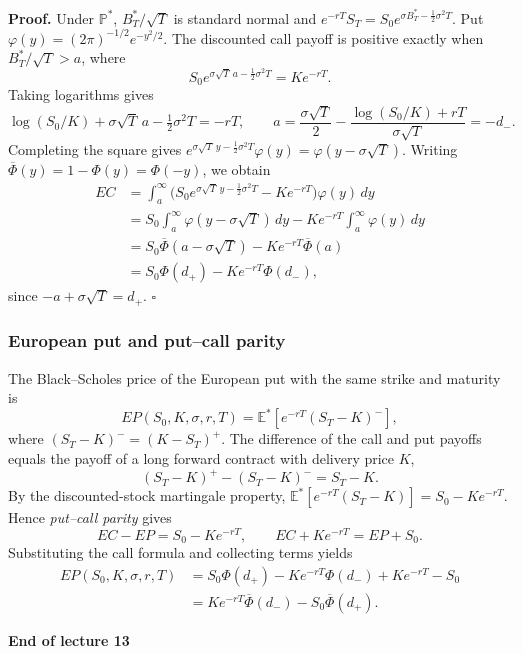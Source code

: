 \documentclass[11pt,a4paper]{article}
\begin{document}
\noindent\textbf{Proof.}
Under $\mathbb P^*$, $B_T^*/\sqrt T$ is standard normal and
$e^{-rT}S_T=S_0e^{\sigma B_T^*-\frac12\sigma^2T}$. Put
$\varphi(y)=(2\pi)^{-1/2}e^{-y^2/2}$. The discounted call payoff is
positive exactly when $B_T^*/\sqrt T>a$, where
\[
S_0e^{\sigma\sqrt T\,a-\frac12\sigma^2T}=Ke^{-rT}.
\]
Taking logarithms gives
\[
\log(S_0/K)+\sigma\sqrt T\,a-\tfrac12\sigma^2T=-rT,
\qquad
a=\frac{\sigma\sqrt T}{2}-\frac{\log(S_0/K)+rT}{\sigma\sqrt T}=-d_-.
\]
Completing the square gives
$e^{\sigma\sqrt T\,y-\frac12\sigma^2T}\varphi(y)
=\varphi(y-\sigma\sqrt T)$. Writing
$\overline\Phi(y)=1-\Phi(y)=\Phi(-y)$, we obtain
\[
\begin{aligned}
EC
&=\int_a^\infty
  \bigl(S_0e^{\sigma\sqrt T\,y-\frac12\sigma^2T}-Ke^{-rT}\bigr)\varphi(y)\,dy\\
&=S_0\int_a^\infty\varphi(y-\sigma\sqrt T)\,dy
  -Ke^{-rT}\int_a^\infty\varphi(y)\,dy\\
&=S_0\overline\Phi(a-\sigma\sqrt T)-Ke^{-rT}\overline\Phi(a)\\
&=S_0\Phi(d_+)-Ke^{-rT}\Phi(d_-),
\end{aligned}
\]
since $-a+\sigma\sqrt T=d_+$. \hfill$\square$

\subsubsection*{European put and put--call parity}

The Black--Scholes price of the European put with the same strike and
maturity is
\[
EP(S_0,K,\sigma,r,T)=\mathbb E^*[e^{-rT}(S_T-K)^-],
\]
where $(S_T-K)^-=(K-S_T)^+$. The difference of the call and put payoffs
equals the payoff of a long forward contract with delivery price $K$,
\[
(S_T-K)^+-(S_T-K)^-=S_T-K.
\]
By the discounted-stock martingale property,
$\mathbb E^*[e^{-rT}(S_T-K)]=S_0-Ke^{-rT}$. Hence \emph{put--call parity}
gives
\[
EC-EP=S_0-Ke^{-rT},
\qquad
EC+Ke^{-rT}=EP+S_0.
\]
Substituting the call formula and collecting terms yields
\[
\begin{aligned}
EP(S_0,K,\sigma,r,T)
&=S_0\Phi(d_+)-Ke^{-rT}\Phi(d_-)+Ke^{-rT}-S_0\\
&=Ke^{-rT}\overline\Phi(d_-)-S_0\overline\Phi(d_+).
\end{aligned}
\]

\begin{center}
\textbf{End of lecture 13}
\end{center}
\end{document}
